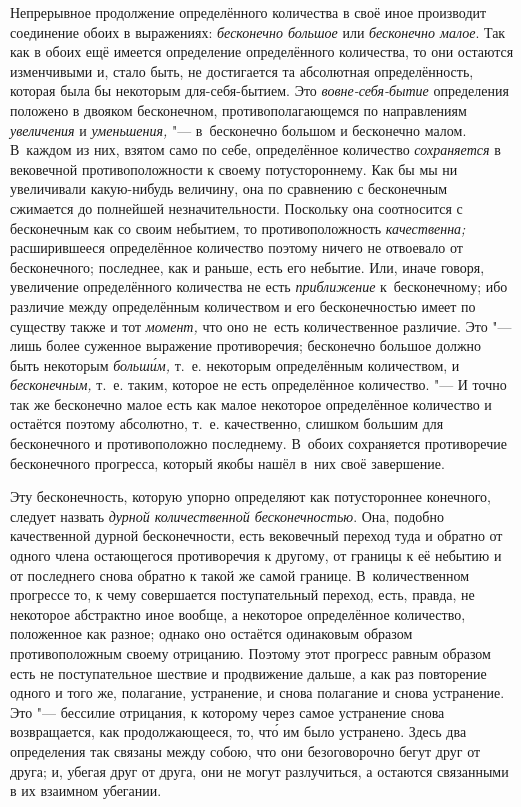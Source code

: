 Непрерывное продолжение определённого количества в своё иное производит
соединение обоих в выражениях: {\em бесконечно большое} или {\em бесконечно
малое}. Так как в обоих ещё имеется определение определённого количества, то
они остаются изменчивыми и, стало быть, не достигается та абсолютная
определённость, которая была бы некоторым для-себя-бытием. Это
{\em вовне-себя-бытие} определения положено в двояком бесконечном,
противополагающемся по направлениям {\em увеличения} и {\em уменьшения,} "---
в~бесконечно большом и бесконечно малом. В~каждом из них, взятом само по себе,
определённое количество {\em сохраняется} в вековечной противоположности к
своему потустороннему. Как бы мы ни увеличивали какую-нибудь величину, она по
сравнению с бесконечным сжимается до полнейшей незначительности. Поскольку она
соотносится с бесконечным как со своим небытием, то противоположность
{\em качественна;} расширившееся определённое количество поэтому ничего не
отвоевало от бесконечного; последнее, как и раньше, есть его небытие. Или,
иначе говоря, увеличение определённого количества не есть {\em приближение}
к~бесконечному; ибо различие между определённым количеством и его
бесконечностью имеет по существу также и тот {\em момент,} что оно не~есть
количественное различие. Это "--- лишь более суженное выражение противоречия;
бесконечно большое должно быть некоторым {\em больш\'{и}м,} т.~е. некоторым
определённым количеством, и {\em бесконечным,} т.~е. таким, которое не есть
определённое количество. "--- И точно так же бесконечно малое есть как малое
некоторое определённое количество и остаётся поэтому абсолютно, т.~е.
качественно, слишком большим для бесконечного и противоположно последнему.
В~обоих сохраняется противоречие бесконечного прогресса, который якобы нашёл
в~них своё завершение.

Эту бесконечность, которую упорно определяют как потустороннее конечного,
следует назвать {\em дурной количественной бесконечностью}. Она, подобно
качественной дурной бесконечности, есть вековечный переход туда и обратно от
одного члена остающегося противоречия к другому, от границы к её небытию и от
последнего снова обратно к такой же самой границе. В~количественном прогрессе
то, к чему совершается поступательный переход, есть, правда, не некоторое
абстрактно иное вообще, а некоторое определённое количество, положенное как
разное; однако оно остаётся одинаковым образом противоположным своему
отрицанию. Поэтому этот прогресс равным образом есть не поступательное шествие
и продвижение дальше, а как раз повторение одного и того же, полагание,
устранение, и снова полагание и снова устранение. Это "--- бессилие отрицания,
к которому через самое устранение снова возвращается, как продолжающееся, то,
чт\'{о} им было устранено. Здесь два определения так связаны между собою, что они
безоговорочно бегут друг от друга; и, убегая друг от друга, они не могут
разлучиться, а остаются связанными в их взаимном убегании.

